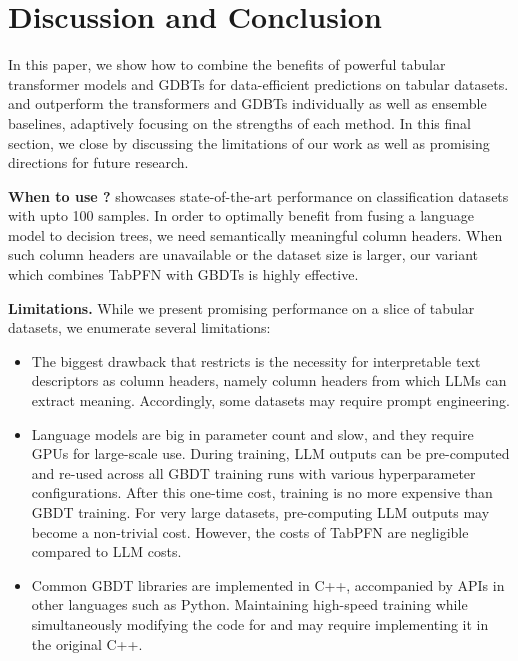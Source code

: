 \section{Discussion and Conclusion}
\label{discussion}

In this paper, we show how to combine the benefits of powerful tabular transformer models and GDBTs for data-efficient predictions on tabular datasets. \methodname and \methodnamepfn outperform the transformers and GDBTs individually as well as ensemble baselines, adaptively focusing on the strengths of each method.  In this final section, we close by discussing the limitations of our work as well as promising directions for future research.

\textbf{When to use \methodname?} \methodname showcases state-of-the-art performance on classification datasets with upto 100 samples. In order to optimally benefit from fusing a language model to decision trees, we need semantically meaningful column headers.  When such column headers are unavailable or the dataset size is larger, our variant \methodnamepfn which combines TabPFN with GBDTs is highly effective.

\textbf{Limitations.} While we present promising performance on a slice of tabular datasets, we enumerate several limitations:
\begin{itemize}
\item The biggest drawback that restricts \methodname is the necessity for interpretable text descriptors as column headers, namely column headers from which LLMs can extract meaning.  Accordingly, some datasets may require prompt engineering.
\item Language models are big in parameter count and slow, and they require GPUs for large-scale use.  During training, LLM outputs can be pre-computed and re-used across all GBDT training runs with various hyperparameter configurations.  After this one-time cost, training is no more expensive than GBDT training.  For very large datasets, pre-computing LLM outputs may become a non-trivial cost. However, the costs of TabPFN are negligible compared to LLM costs.
\item Common GBDT libraries are implemented in C++, accompanied by APIs in other languages such as Python.  Maintaining high-speed training while simultaneously modifying the code for \methodname and \methodnamepfn may require implementing it in the original C++.
\end{itemize} 

